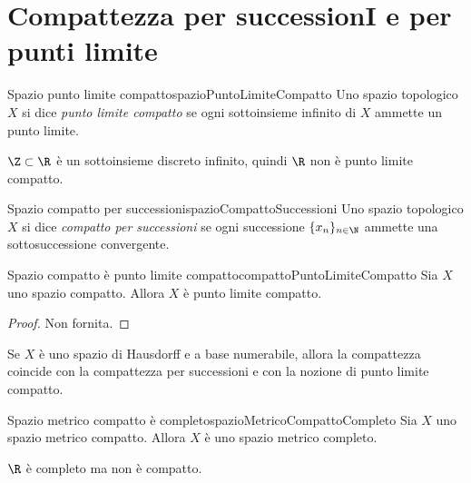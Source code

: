 \section{Compattezza per successionI e per punti limite}

\begin{defn}{Spazio punto limite compatto}{spazioPuntoLimiteCompatto}
	Uno spazio topologico \(X\) si dice \emph{punto limite compatto} se ogni sottoinsieme infinito di \(X\) ammette un punto limite.
\end{defn}

\begin{ese}
	\(\Z\subset \R\) è un sottoinsieme discreto infinito, quindi \(\R\) non è punto limite compatto.
\end{ese}

\begin{defn}{Spazio compatto per successioni}{spazioCompattoSuccessioni}
	Uno spazio topologico \(X\) si dice \emph{compatto per successioni} se ogni successione \(\{x_n\}_{n\in\N}\) ammette una sottosuccessione convergente.
\end{defn}

\begin{prop}{Spazio compatto è punto limite compatto}{compattoPuntoLimiteCompatto}
	Sia \(X\) uno spazio compatto.
	Allora \(X\) è punto limite compatto.
\end{prop}

\begin{proof}
	Non fornita.
\end{proof}

\begin{lem}
	Se \(X\) è uno spazio di Hausdorff e a base numerabile, allora la compattezza coincide con la compattezza per successioni e con la nozione di punto limite compatto.
\end{lem}

\begin{prop}{Spazio metrico compatto è completo}{spazioMetricoCompattoCompleto}
	Sia \(X\) uno spazio metrico compatto.
	Allora \(X\) è uno spazio metrico completo.
\end{prop}

\begin{oss}
	\(\R\) è completo ma non è compatto.
\end{oss}
%
%
